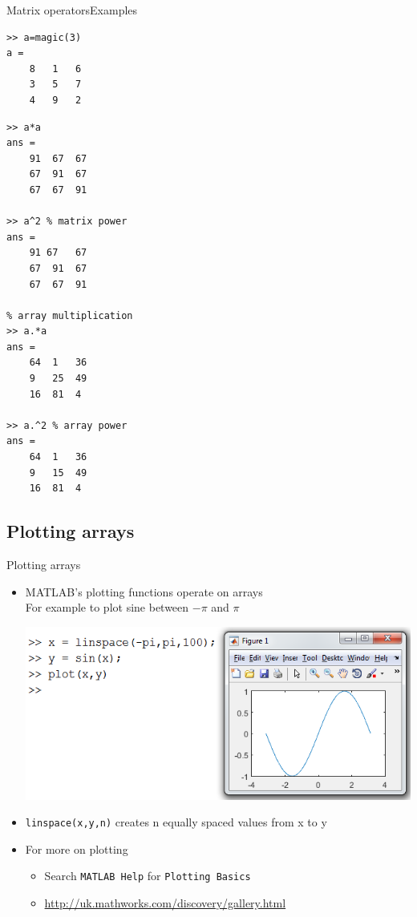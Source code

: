 \documentclass{beamer}
\begin{document}
\begin{frame}[fragile]{Matrix operators}{Examples}
	\begin{lstlisting}[style=Matlab-editor,basicstyle=\footnotesize]
>> a=magic(3)
a =
	8	1	6
	3	5	7
	4	9	2
	\end{lstlisting}
	
	\begin{multicols}{2}
		\begin{lstlisting}[style=Matlab-editor,basicstyle=\footnotesize]
% matrix multiplication
>> a*a 
ans = 
	91	67	67
	67	91	67
	67	67	91

>> a^2 % matrix power
ans = 
	91 67	67
	67	91	67
	67	67	91

% array multiplication
>> a.*a 
ans = 
	64	1	36
	9	25	49
	16	81	4

>> a.^2 % array power
ans =
	64	1	36
	9	15	49
	16	81	4
		\end{lstlisting}
	\end{multicols}	
\end{frame}
	
\subsection{Plotting arrays}
\begin{frame}{Plotting arrays}{}
	\begin{itemize}
		\item MATLAB's plotting functions operate on arrays\\
		For example to plot sine between $-\pi$ and $\pi$
		
		\includegraphics[width=\textwidth]{sine_plot}
		\item \texttt{linspace(x,y,n)} creates n equally spaced values from x to y
		\item For more on plotting
			\begin{itemize}
				\item Search \texttt{MATLAB Help} for \texttt{Plotting Basics}
				\item \url{http://uk.mathworks.com/discovery/gallery.html}
			\end{itemize}
	\end{itemize}
\end{frame}
\end{document}
